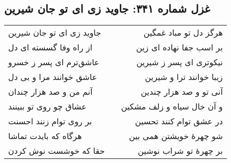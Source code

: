 \begin{center}
\section*{غزل شماره ۳۴۱: جاوید زی ای تو جان شیرین}
\label{sec:341}
\begin{longtable}{l p{0.5cm} r}
جاوید زی ای تو جان شیرین
&&
هرگز دل تو مباد غمگین
\\
از راه وفا گسسته ای دل
&&
بر اسب جفا نهاده ای زین
\\
عاشق‌ترم ای پسر ز خسرو
&&
نیکوتری ای پسر ز شیرین
\\
عاشق خوانند مرا و بی دل
&&
زیبا خوانند ترا و شیرین
\\
آنم من و صد هزار چندان
&&
آنی تو و صد هزار چندین
\\
عشاق چو روی تو ببینند
&&
و آن خال سیاه و زلف مشکین
\\
بر روی توام زنند احسنت
&&
در عشق توام کنند تحسین
\\
هرگاه که بایدت تماشا
&&
شو چهرهٔ خویشتن همی بین
\\
حقا که خوشست نوش کردن
&&
بر چهرهٔ تو شراب نوشین
\\
\end{longtable}
\end{center}
